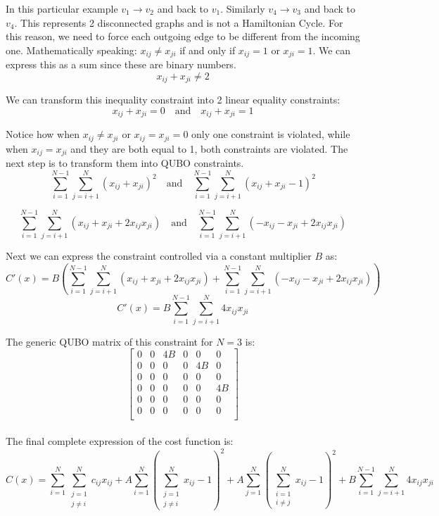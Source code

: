 \documentclass[12pt,a4paper]{report}
\begin{document}
\noindent
In this particular example \(v_1 \rightarrow v_2\) and back to \(v_1\). Similarly \(v_4 \rightarrow v_3\) and back to \(v_4\). This represents 2 disconnected graphs and is not a Hamiltonian Cycle. For this reason, we need to force each outgoing edge to be different from the incoming one. Mathematically speaking: \( x_{ij} \neq x_{ji} \) if and only if \( x_{ij} = 1 \) or \( x_{ji} = 1 \). We can express this as a sum since these are binary numbers.
\[
x_{ij}+x_{ji} \neq 2
\]

\noindent
We can transform this inequality constraint into 2 linear equality constraints:
\[
x_{ij} + x_{ji} = 0 \quad \text{and} \quad x_{ij} + x_{ji} = 1
\]

\noindent
Notice how when \( x_{ij} \neq x_{ji} \) or \(x_{ij} = x_{ji} = 0\) only one constraint is violated, while when \( x_{ij} = x_{ji} \) and they are both equal to 1, both constraints are violated. The next step is to transform them into QUBO constraints.
\[
\sum_{i=1}^{N-1} \sum_{j=i+1}^{N} (x_{ij} + x_{ji})^2 \quad \text{and} \quad \sum_{i=1}^{N-1} \sum_{j=i+1}^{N} (x_{ij} + x_{ji} - 1)^2
\]

\[
\sum_{i=1}^{N-1} \sum_{j=i+1}^{N} (x_{ij} + x_{ji} + 2x_{ij}x_{ji}) \quad \text{and} \quad \sum_{i=1}^{N-1} \sum_{j=i+1}^{N} (-x_{ij} - x_{ji} + 2x_{ij}x_{ji})
\]

\noindent
Next we can express the constraint controlled via a constant multiplier \( B \) as:
\[
C'(x) = B \left( \sum_{i=1}^{N-1} \sum_{j=i+1}^{N} (x_{ij} + x_{ji} + 2x_{ij}x_{ji}) + \sum_{i=1}^{N-1} \sum_{j=i+1}^{N} (-x_{ij} - x_{ji} + 2x_{ij}x_{ji}) \right)
\]
\[
C'(x) = B \sum_{i=1}^{N-1} \sum_{j=i+1}^{N} 4x_{ij}x_{ji}
\]

\noindent
The generic QUBO matrix of this constraint for \( N=3 \) is:
\[
\begin{bmatrix}
0 & 0 & 4B & 0 & 0 & 0 \\
0 & 0 & 0 & 0 & 4B & 0 \\
0 & 0 & 0 & 0 & 0 & 0 \\
0 & 0 & 0 & 0 & 0 & 4B \\
0 & 0 & 0 & 0 & 0 & 0 \\
0 & 0 & 0 & 0 & 0 & 0 \\
\end{bmatrix}
\]
\\

\noindent
The final complete expression of the cost function is:
\[
C(x) = \sum_{i=1}^{N} \sum_{\substack{j=1 \\ j \neq i}}^{N} c_{ij}x_{ij} + A \sum_{i=1}^{N} \left( \sum_{\substack{j=1 \\ j \neq i}}^{N} x_{ij} - 1 \right)^2 + A \sum_{j=1}^{N} \left( \sum_{\substack{i=1 \\ i \neq j}}^{N} x_{ij} - 1 \right)^2 + B \sum_{i=1}^{N-1} \sum_{j=i+1}^{N} 4x_{ij}x_{ji}
\]
\end{document}

